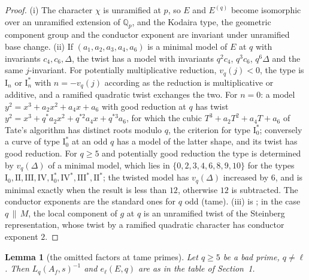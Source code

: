\documentclass[11pt]{amsart}
\newtheorem{lemma}[theorem]{Lemma}
\theoremstyle{definition}
\newcommand{\Q}{\mathbb{Q}}
\begin{document}
\begin{proof}
(i) The character $\chi$ is unramified at $p$, so $E$ and $E^{(q)}$ become isomorphic over an unramified extension of $\Q_p$, and the Kodaira type, the geometric component group and the conductor exponent are invariant under unramified base change. (ii) If $(a_1,a_2,a_3,a_4,a_6)$ is a minimal model of $E$ at $q$ with invariants $c_4,c_6,\Delta$, the twist has a model with invariants $q^{2}c_4$, $q^{3}c_6$, $q^{6}\Delta$ and the same $j$-invariant. For potentially multiplicative reduction, $v_q(j)<0$, the type is $\mathrm{I}_n$ or $\mathrm{I}_n^*$ with $n=-v_q(j)$ according as the reduction is multiplicative or additive, and a ramified quadratic twist exchanges the two. For $n=0$: a model $y^2=x^3+a_2x^2+a_4x+a_6$ with good reduction at $q$ has twist $y^2=x^3+q^*a_2x^2+q^{*2}a_4x+q^{*3}a_6$, for which the cubic $T^3+a_2T^2+a_4T+a_6$ of Tate's algorithm has distinct roots modulo $q$, the criterion for type $\mathrm{I}_0^*$; conversely a curve of type $\mathrm{I}_0^*$ at an odd $q$ has a model of the latter shape, and its twist has good reduction. For $q\ge5$ and potentially good reduction the type is determined by $v_q(\Delta)$ of a minimal model, which lies in $\{0,2,3,4,6,8,9,10\}$ for the types $\mathrm{I}_0,\mathrm{II},\mathrm{III},\mathrm{IV},\mathrm{I}_0^*,\mathrm{IV}^*,\mathrm{III}^*,\mathrm{II}^*$; the twisted model has $v_q(\Delta)$ increased by $6$, and is minimal exactly when the result is less than $12$, otherwise $12$ is subtracted. The conductor exponents are the standard ones for $q$ odd (tame). (iii) is \cite[Theorem 3.1]{AtkinLi78}; in the case $q\,\|\,M$, the local component of $g$ at $q$ is an unramified twist of the Steinberg representation, whose twist by a ramified quadratic character has conductor exponent $2$.
\end{proof}

\begin{lemma}[the omitted factors at tame primes]\label{lem:euler}
Let $q\ge5$ be a bad prime, $q\ne\ell$. Then $L_q(A_f,s)^{-1}$ and $e_\ell(E,q)$ are as in the table of Section~1.
\end{lemma}
\end{document}
